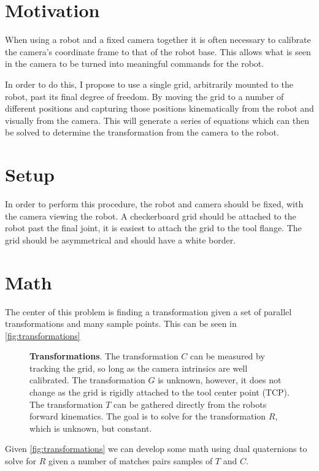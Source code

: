 \documentclass[12pt]{article}
\begin{document}
	
	\section{Motivation}
	When using a robot and a fixed camera together it is often necessary to calibrate the camera's coordinate frame to that of the robot base. This allows what is seen in the camera to be turned into meaningful commands for the robot. 
	
	In order to do this, I propose to use a single grid, arbitrarily mounted to the robot, past its final degree of freedom. By moving the grid to a number of different positions and capturing those positions kinematically from the robot and visually from the camera. This will generate a series of equations which can then be solved to determine the transformation from the camera to the robot. 
	
	\section{Setup}
	In order to perform this procedure, the robot and camera should be fixed, with the camera viewing the robot. A checkerboard grid should be attached to the robot past the final joint, it is easiest to attach the grid to the tool flange. The grid should be asymmetrical and should have a white border. 
	
	\section{Math}
	The center of this problem is finding a transformation given a set of parallel transformations and many sample points. This can be seen in \autoref{fig:transformations}
	
	\begin{figure}
		\centering
		\def\svgwidth{\textwidth}
		
		\caption{\textbf{Transformations}. The transformation $C$ can be measured by tracking the grid, so long as the camera intrinsics are well calibrated. The transformation $G$ is unknown, however, it does not change as the grid is rigidly attached to the tool center point (TCP). The transformation $T$ can be gathered directly from the robots forward kinematics. The goal is to solve for the transformation $R$, which is unknown, but constant.}
		\label{fig:transformations}
	\end{figure}
	
	Given \autoref{fig:transformations} we can develop some math using dual quaternions to solve for $R$ given a number of matches pairs samples of $T$ and $C$. 
	
\end{document}
